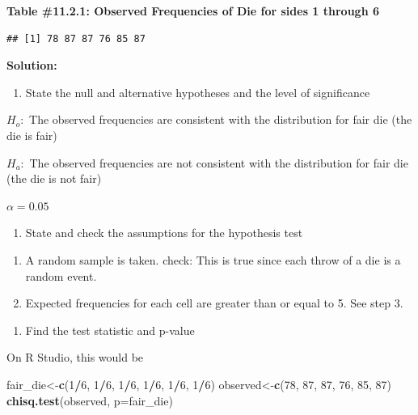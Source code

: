 \documentclass[]{book}
\newenvironment{Shaded}{\begin{snugshade}}{\end{snugshade}}
\newcommand{\DataTypeTok}[1]{\textcolor[rgb]{0.13,0.29,0.53}{#1}}
\newcommand{\DecValTok}[1]{\textcolor[rgb]{0.00,0.00,0.81}{#1}}
\newcommand{\KeywordTok}[1]{\textcolor[rgb]{0.13,0.29,0.53}{\textbf{#1}}}
\newcommand{\NormalTok}[1]{#1}
\newcommand{\OperatorTok}[1]{\textcolor[rgb]{0.81,0.36,0.00}{\textbf{#1}}}
\providecommand{\tightlist}{%
  \setlength{\itemsep}{0pt}\setlength{\parskip}{0pt}}
\begin{document}
\textbf{Table \#11.2.1: Observed Frequencies of Die for sides 1 through 6}

\begin{verbatim}
## [1] 78 87 87 76 85 87
\end{verbatim}

\textbf{Solution:}

\begin{enumerate}
\def\labelenumi{\arabic{enumi}.}
\tightlist
\item
  State the null and alternative hypotheses and the level of significance
\end{enumerate}

\(H_o:\) The observed frequencies are consistent with the distribution for fair die (the die is fair)

\(H_a:\) The observed frequencies are not consistent with the distribution for fair die (the die is not fair)

\(\alpha=0.05\)

\begin{enumerate}
\def\labelenumi{\arabic{enumi}.}
\setcounter{enumi}{1}
\tightlist
\item
  State and check the assumptions for the hypothesis test
\end{enumerate}

\begin{enumerate}
\def\labelenumi{\alph{enumi}.}
\item
  A random sample is taken. check: This is true since each throw of a die is a random event.
\item
  Expected frequencies for each cell are greater than or equal to 5. See step 3.
\end{enumerate}

\begin{enumerate}
\def\labelenumi{\arabic{enumi}.}
\setcounter{enumi}{2}
\tightlist
\item
  Find the test statistic and p-value
\end{enumerate}

On R Studio, this would be

\begin{Shaded}
\begin{Highlighting}[]
\NormalTok{fair_die<-}\KeywordTok{c}\NormalTok{(}\DecValTok{1}\OperatorTok{/}\DecValTok{6}\NormalTok{, }\DecValTok{1}\OperatorTok{/}\DecValTok{6}\NormalTok{, }\DecValTok{1}\OperatorTok{/}\DecValTok{6}\NormalTok{, }\DecValTok{1}\OperatorTok{/}\DecValTok{6}\NormalTok{, }\DecValTok{1}\OperatorTok{/}\DecValTok{6}\NormalTok{, }\DecValTok{1}\OperatorTok{/}\DecValTok{6}\NormalTok{)}
\NormalTok{observed<-}\KeywordTok{c}\NormalTok{(}\DecValTok{78}\NormalTok{, }\DecValTok{87}\NormalTok{, }\DecValTok{87}\NormalTok{, }\DecValTok{76}\NormalTok{, }\DecValTok{85}\NormalTok{, }\DecValTok{87}\NormalTok{)}
\KeywordTok{chisq.test}\NormalTok{(observed, }\DataTypeTok{p=}\NormalTok{fair_die)}
\end{Highlighting}
\end{Shaded}
\end{document}
